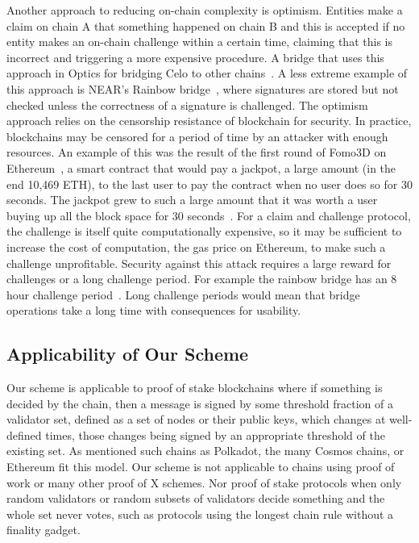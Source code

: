 \noindent Another approach to reducing on-chain complexity is optimism. Entities make a claim on chain A that something happened on chain B and this is accepted if no entity makes an on-chain challenge within a certain time, claiming that this is incorrect and triggering a more expensive procedure. A bridge that uses this approach in Optics for bridging Celo to other chains~\cite{CeloOptics}. A less extreme example of this approach is NEAR's Rainbow bridge~\cite{NEARrainbowB}, where signatures are stored but not checked unless the correctness of a signature is challenged. The optimism approach relies on the censorship resistance of blockchain for security. In practice, blockchains may be censored for a period of time by an attacker with enough resources. An example of this was the result of the first round of Fomo3D on Ethereum~\cite{Fomo3DPM}, a smart contract that would pay a jackpot, a large amount (in the end 10,469 ETH), to the last user to pay the contract when no user does so for 30 seconds. The jackpot grew to such a large amount that it was worth a user buying up all the block space for 30 seconds~\cite{Fomo3DPM}. For a claim and challenge protocol, the challenge is itself quite computationally expensive, so it may be sufficient to increase the cost of computation, the gas price on Ethereum, to make such a challenge unprofitable. Security against this attack requires a large reward for challenges or a long challenge period. For example the rainbow bridge has an 8 hour challenge period~\cite{RainbowBridgeFAQ}. Long challenge periods would mean that bridge operations take a long time with consequences for usability.
\vspace{-0.08in}
\subsection{Applicability of Our Scheme}

\noindent Our scheme is applicable to proof of stake blockchains where if something is decided by the chain, then a message is signed by some threshold fraction of a validator set, defined as a set of nodes or their public keys, which changes at well-defined times, those changes being signed by an appropriate threshold of the existing set. As mentioned such chains as Polkadot, the many Cosmos chains, or Ethereum fit this model. Our scheme is not applicable to chains using proof of work or many other proof of X schemes. Nor proof of stake protocols when only random validators or random subsets of validators decide something and the whole set never votes, such as protocols using the longest chain rule without a finality gadget. \\

